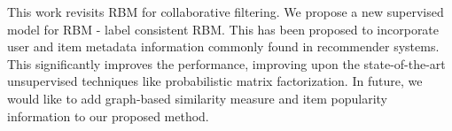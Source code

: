 \documentclass[conference]{IEEEtran}
\begin{document}
This work revisits RBM for collaborative filtering. We propose a new supervised model for RBM - label consistent RBM. This has been proposed to incorporate user and item metadata information commonly found in recommender systems. This significantly improves the performance, improving upon the state-of-the-art unsupervised techniques like probabilistic matrix factorization. In future, we would like to add graph-based similarity measure \cite{Lien} and item popularity information \cite{Steck} to our proposed method.



 
\end{document}
